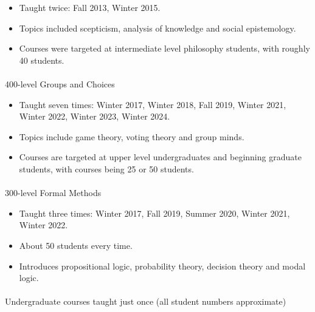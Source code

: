 \documentclass[
  10pt,
  letterpaper,
  DIV=11,
  numbers=noendperiod,
  twoside]{scrartcl}
\makeatletter
\let\oldparagraph\paragraph
\renewcommand{\paragraph}{
    \@ifstar
      \xxxParagraphStar
      \xxxParagraphNoStar
  }
\newcommand{\xxxParagraphStar}[1]{\oldparagraph*{#1}\mbox{}}
\newcommand{\xxxParagraphNoStar}[1]{\oldparagraph{#1}\mbox{}}
\providecommand{\tightlist}{%
  \setlength{\itemsep}{0pt}\setlength{\parskip}{0pt}}
\makeatother
\begin{document}
\begin{itemize}
\tightlist
\item
  Taught twice: Fall 2013, Winter 2015.
\item
  Topics included scepticism, analysis of knowledge and social
  epistemology.
\item
  Courses were targeted at intermediate level philosophy students, with
  roughly 40 students.
\end{itemize}

\paragraph{400-level Groups and Choices}\label{level-groups-and-choices}

\begin{itemize}
\tightlist
\item
  Taught seven times: Winter 2017, Winter 2018, Fall 2019, Winter 2021,
  Winter 2022, Winter 2023, Winter 2024.
\item
  Topics include game theory, voting theory and group minds.
\item
  Courses are targeted at upper level undergraduates and beginning
  graduate students, with courses being 25 or 50 students.
\end{itemize}

\paragraph{300-level Formal Methods}\label{level-formal-methods}

\begin{itemize}
\tightlist
\item
  Taught three times: Winter 2017, Fall 2019, Summer 2020, Winter 2021,
  Winter 2022.
\item
  About 50 students every time.
\item
  Introduces propositional logic, probability theory, decision theory
  and modal logic.
\end{itemize}

\paragraph{Undergraduate courses taught just once (all student numbers
approximate)}\label{undergraduate-courses-taught-just-once-all-student-numbers-approximate}
\end{document}
